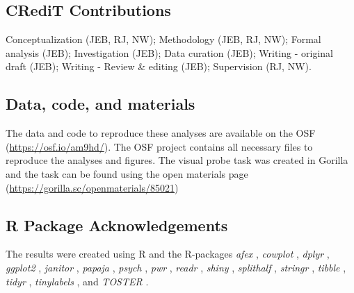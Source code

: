\documentclass[empirical, authordate, issue]{jote-new-article}
\begin{document}
\subsection{CRediT Contributions}

Conceptualization (JEB, RJ, NW); Methodology (JEB, RJ, NW); Formal analysis (JEB); Investigation (JEB); Data curation (JEB); Writing - original draft (JEB); Writing - Review \& editing (JEB); Supervision (RJ, NW).

\subsection{Data, code, and materials}

The data and code to reproduce these analyses are available on the OSF (\url{https://osf.io/am9hd/}). The OSF project contains all necessary files to reproduce the analyses and figures. The visual probe task was created in Gorilla and the task can be found using the open materials page (\url{https://gorilla.sc/openmaterials/85021})

\subsection{R Package Acknowledgements}

The results were created using R \parencite[version 4.1.3][]{RCoreTeam2020} and the R-packages \emph{afex} \parencite[version 1.0.1][]{Singmann2020}, \emph{cowplot} \parencite[version 1.1.1][]{Wilke2019}, \emph{dplyr} \parencite[version 1.0.10][]{Wickham2020}, \emph{ggplot2} \parencite[version 3.3.5][]{Wickham2016}, \emph{janitor} \parencite[version 2.1.0][]{Firke2019}, \emph{papaja} \parencite[version 0.1.1][]{Aust2022}, \emph{psych} \parencite[version 2.2.3][]{Revelle2019}, \emph{pwr} \parencite[version 1.3.0][]{Champely2020}, \emph{readr} \parencite[version 2.1.2][]{Wickham2018}, \emph{shiny} \parencite[version 1.7.1][]{Chang2020}, \emph{splithalf} \parencite[version 0.8.2][]{Parsons2020}, \emph{stringr} \parencite[version 1.4.0][]{Wickham2019}, \emph{tibble} \parencite[version 3.1.6][]{Müller2020}, \emph{tidyr} \parencite[version 1.2.0][]{Wickham2020}, \emph{tinylabels} \parencite[version 0.2.3][]{Barth2022}, and \emph{TOSTER} \parencite[version 0.4.0][]{Lakens2017}.


\end{document}
